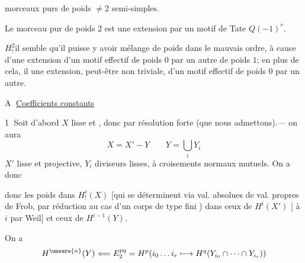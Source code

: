 morceaux purs de poids $\ne2$  semi-simples.

\margin{$\Vert$}
Le morceau pur de poids $2$ est une extension par un motif de Tate $Q(-1)^r$.

$H^2_!$\qquad il semble qu'il puisse y avoir mélange de poids dans le mauvais ordre, à cause d'une extension d'un motif effectif de poids $0$ par un autre de poids $1$; en plus de cela, il  une extension, peut-être non triviale, d'un motif effectif de poids $0$  par un autre.

\textcircled{A} \uline{Coefficients constants}

\textcircled{1} Soit d'abord $X$ lisse et , donc par résolution forte (que nous admettons).--- on aura
\[
X=X'-Y\qquad Y=\bigcup_iY_i
\]
$X'$ lisse et projective, $Y_i$ diviseurs lisses,  à croisements normaux mutuels.  On a donc


 donc les poids dans $H^i_!(X)$ [qui se déterminent via val. absolues de val. propres de Frob, par réduction au cas d'un corps de type fini \unsure{\ldots})  dans ceux de $H^i(X')$ [ à $i$ par Weil] et ceux de $H^{i-1}(Y)$.

On a
\[
H^{\unsure{n}}(Y)\Longleftarrow E^{pq}_2
=H^p(i_0\ldots i_r\longmapsto H^q(Y_{i_0}\cap\cdots\cap Y_{i_r}))
\]

